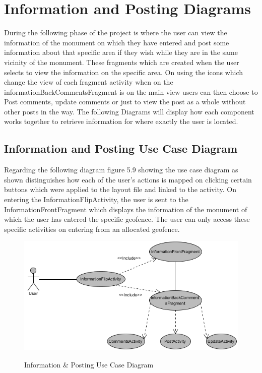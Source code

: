 \section{Information and Posting Diagrams}
During the following phase of the project is where the user can view the information of the monument on which they have entered and post some information about that specific area if they wish while they are in the same vicinity of the monument. These fragments which are created when the user selects to view the information on the specific area. On using the icons which change the view of each fragment activity when on the informationBackCommentsFragment is on the main view users can then choose to Post comments, update comments or just to view the post as a whole without other posts in the way. The following Diagrams will display how each component works together to retrieve information for where exactly the user is located.

\subsection{Information and Posting Use Case Diagram}
Regarding the following diagram figure 5.9 showing the use case diagram as shown distinguishes how each of the user's actions is mapped on clicking certain buttons which were applied to the layout file and linked to the activity. On entering the InformationFlipActivity, the user is sent to the InformationFrontFragment which displays the information of the monument of which the user has entered the specific geofence. The user can only access these specific activities on entering from an allocated geofence.\par

\begin{figure}[htbp]
    \center \includegraphics[width=350pt]{PostingAndInformationUsecase}\\
    \caption{Information \& Posting Use Case Diagram} \label{Figure: Information & Posting Use Case Diagram }
\end{figure}

